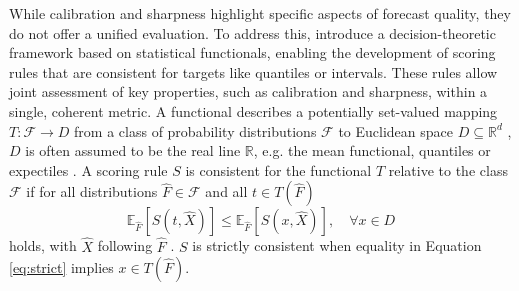 \documentclass[a4paper,oneside,bibliography=totoc]{scrbook}
\begin{document}
\noindent
While calibration and sharpness highlight specific aspects of forecast quality, they do not offer a unified evaluation. To address this, \citet{gneiting_making_2011} introduce a decision-theoretic framework based on statistical functionals, enabling the development of scoring rules that are consistent for targets like quantiles or intervals. These rules allow joint assessment of key properties, such as calibration and sharpness, within a single, coherent metric.
A functional describes a potentially set-valued mapping $T:\mathcal{F} \xrightarrow{} D$ from a class of probability distributions $\mathcal{F}$ to Euclidean space $D \subseteq\mathbb{R}^d$ \cite{horowitz_identification_2006, huber_robust_2011}, $D$ is often assumed to be the real line $\mathbb{R}$, e.g. the mean functional, quantiles or expectiles \cite{gneiting_probabilistic_2014}.
A scoring rule $S$ is consistent \cite{murphy_forecast_1985} for the functional $T$ relative to the class $\mathcal{F}$ if for all distributions $\hat{F} \in \mathcal{F}$ and all $t \in T(\hat{F})$ 
\begin{equation}
    \mathbb{E}_{\hat{F}}[S(t, \hat{X})] \leq \mathbb{E}_{\hat{F}} [S(x, \hat{X})], \quad \forall x\in D
    \label{eq:strict}
\end{equation}
holds, with $\hat{X}$ following $\hat{F}$ \cite{gneiting_making_2011}. $S$ is strictly consistent when equality in Equation \ref{eq:strict} implies $x\in T(\hat{F})$.
\end{document}
